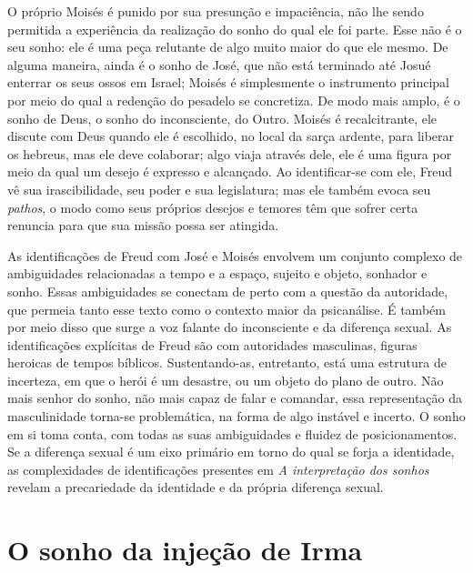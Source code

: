 O próprio Moisés é punido por sua presunção e impaciência, não lhe sendo
permitida a experiência da realização do sonho do qual ele foi parte.
Esse não é o seu sonho: ele é uma peça relutante de algo muito maior do
que ele mesmo. De alguma maneira, ainda é o sonho de José, que não está
terminado até Josué enterrar os seus ossos em Israel; Moisés é
simplesmente o instrumento principal por meio do qual a redenção do
pesadelo se concretiza. De modo mais amplo, é o sonho de Deus, o sonho
do inconsciente, do Outro. Moisés é recalcitrante, ele discute com Deus
quando ele é escolhido, no local da sarça ardente, para liberar os
hebreus, mas ele deve colaborar; algo viaja através dele, ele é uma
figura por meio da qual um desejo é expresso e alcançado. Ao
identificar-se com ele, Freud vê sua irascibilidade, seu poder e sua
legislatura; mas ele também evoca seu \emph{pathos}, o modo como seus
próprios desejos e temores têm que sofrer certa renuncia para que sua
missão possa ser atingida.

As identificações de Freud com José e Moisés envolvem um conjunto
complexo de ambiguidades relacionadas a tempo e a espaço, sujeito e
objeto, sonhador e sonho. Essas ambiguidades se conectam de perto com a
questão da autoridade, que permeia tanto esse texto como o contexto
maior da psicanálise. É também por meio disso que surge a voz falante do
inconsciente e da diferença sexual. As identificações explícitas de
Freud são com autoridades masculinas, figuras heroicas de tempos
bíblicos. Sustentando-as, entretanto, está uma estrutura de incerteza,
em que o herói é um desastre, ou um objeto do plano de outro. Não mais
senhor do sonho, não mais capaz de falar e comandar, essa representação
da masculinidade torna-se problemática, na forma de algo instável e
incerto. O sonho em si toma conta, com todas as suas ambiguidades e
fluidez de posicionamentos. Se a diferença sexual é um eixo primário em
torno do qual se forja a identidade, as complexidades de identificações
presentes em \emph{A interpretação dos sonhos} revelam a precariedade da
identidade e da própria diferença sexual.

\section{O sonho da injeção de Irma}

